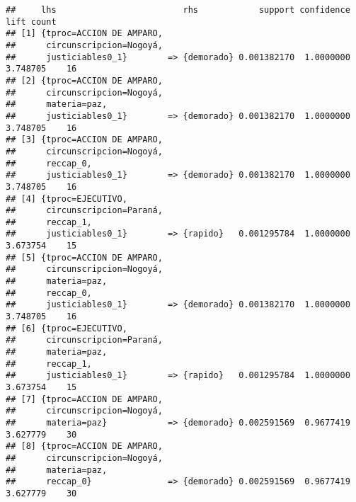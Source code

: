 \documentclass[runningheads,a4paper]{llncs}
\begin{document}
\begin{verbatim}
##     lhs                         rhs            support confidence     lift count
## [1] {tproc=ACCION DE AMPARO,                                                    
##      circunscripcion=Nogoyá,                                                    
##      justiciables0_1}        => {demorado} 0.001382170  1.0000000 3.748705    16
## [2] {tproc=ACCION DE AMPARO,                                                    
##      circunscripcion=Nogoyá,                                                    
##      materia=paz,                                                               
##      justiciables0_1}        => {demorado} 0.001382170  1.0000000 3.748705    16
## [3] {tproc=ACCION DE AMPARO,                                                    
##      circunscripcion=Nogoyá,                                                    
##      reccap_0,                                                                  
##      justiciables0_1}        => {demorado} 0.001382170  1.0000000 3.748705    16
## [4] {tproc=EJECUTIVO,                                                           
##      circunscripcion=Paraná,                                                    
##      reccap_1,                                                                  
##      justiciables0_1}        => {rapido}   0.001295784  1.0000000 3.673754    15
## [5] {tproc=ACCION DE AMPARO,                                                    
##      circunscripcion=Nogoyá,                                                    
##      materia=paz,                                                               
##      reccap_0,                                                                  
##      justiciables0_1}        => {demorado} 0.001382170  1.0000000 3.748705    16
## [6] {tproc=EJECUTIVO,                                                           
##      circunscripcion=Paraná,                                                    
##      materia=paz,                                                               
##      reccap_1,                                                                  
##      justiciables0_1}        => {rapido}   0.001295784  1.0000000 3.673754    15
## [7] {tproc=ACCION DE AMPARO,                                                    
##      circunscripcion=Nogoyá,                                                    
##      materia=paz}            => {demorado} 0.002591569  0.9677419 3.627779    30
## [8] {tproc=ACCION DE AMPARO,                                                    
##      circunscripcion=Nogoyá,                                                    
##      materia=paz,                                                               
##      reccap_0}               => {demorado} 0.002591569  0.9677419 3.627779    30
\end{verbatim}
\end{document}
